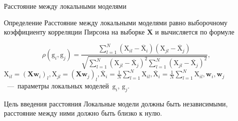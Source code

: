 \documentclass[9pt,pdf,hyperref={unicode}]{beamer}
\begin{document}
\begin{frame}{Расстояние между локальными моделями}
\begin{block}{Определение}
    Расстояние между локальными моделями равно выборочному коэффициенту корреляции Пирсона на выборке $\mathbf{X}$ и вычисляется по формуле
    
    \[\rho(\mathrm{g}_i, \mathrm{g}_j) = \frac{\sum\limits_{l=1}^N \left(\mathrm{X}_{il} - \overline{\mathrm{X}}_{i}\right)\left(\mathrm{X}_{jl} - \overline{\mathrm{X}}_{j}\right)}{\sqrt{\sum\limits_{l=1}^N \left(\mathrm{X}_{jl} - \overline{\mathrm{X}}_{j}\right)^2 \sum\limits_{l=1}^N \left(\mathrm{X}_{jl} - \overline{\mathrm{X}}_{j}\right)^2}}, \]
    $\mathrm{X}_{il} = (\mathbf{X}\mathbf{w}_i)_l, \mathrm{X}_{jl} = (\mathbf{X}\mathbf{w}_j)_l, \overline{\mathrm{X}}_i = \frac{1}{N}\sum\limits_{l=1}^N \mathrm{X}_{il}, \overline{\mathrm{X}}_i = \frac{1}{N}\sum\limits_{l=1}^N \mathrm{X}_{il}, \mathbf{w}_i, \mathbf{w}_j$~---~параметры локальных моделей~$\mathrm{g}_i$, $\mathrm{g}_j$.
    
\end{block}
\begin{block}{Цель введения расстояния}
Локальные модели должны быть независимыми, расстояние между ними должно быть близко к нулю.
\end{block}
    
\end{frame}
\end{document}
